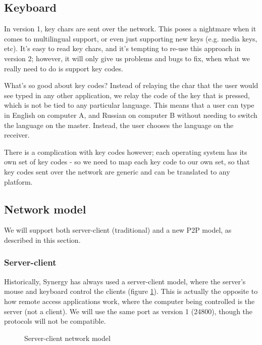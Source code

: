 \subsection{Keyboard}

In version 1, key chars are sent over the network. This poses a nightmare when
it comes to multilingual support, or even just supporting new keys (e.g. media
keys, etc). It's easy to read key chars, and it's tempting to re-use this 
approach in version 2; however, it will only give us problems and bugs to fix,
when what we really need to do is support key codes.

What's so good about key codes? Instead of relaying the char that the user would
see typed in any other application, we relay the code of the key that is 
pressed, which is not be tied to any particular language. This means that a user
can type in English on computer A, and Russian on computer B without needing to
switch the language on the master. Instead, the user chooses the language on
the receiver.

There is a complication with key codes however; each operating system has its
own set of key codes - so we need to map each key code to our own set, so that
key codes sent over the network are generic and can be translated to any 
platform.

\subsection{Network model}

We will support both server-client (traditional) and a new P2P model, as
described in this section.

\subsubsection{Server-client}

Historically, Synergy has always used a server-client model, where the server's
mouse and keyboard control the clients (figure \ref{fig:serverClient}). This is
actually the opposite to how remote access applications work, where the computer
being controlled is the server (not a client). We will use the same port as 
version 1 (24800), though the protocols will not be compatible.

\begin{figure}[ht!]
  \centering
  
  \caption{Server-client network model}
  \label{fig:serverClient}
\end{figure}


